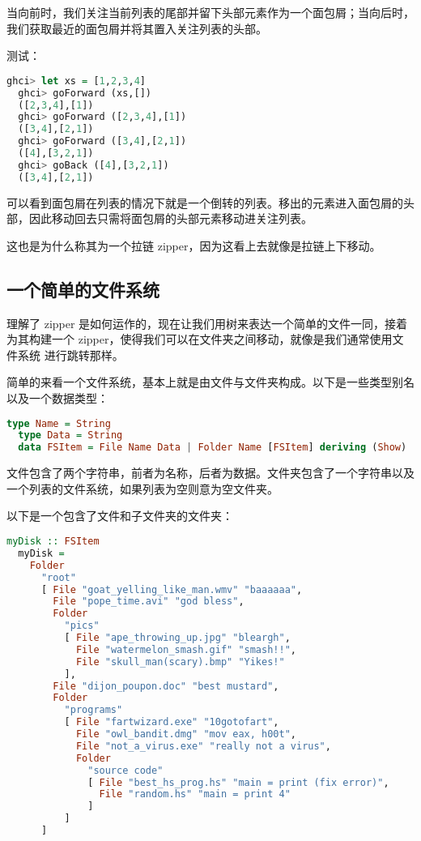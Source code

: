 \documentclass[./main.tex]{subfiles}
\begin{document}
当向前时，我们关注当前列表的尾部并留下头部元素作为一个面包屑；当向后时，我们获取最近的面包屑并将其置入关注列表的头部。

测试：

\begin{lstlisting}[language=Haskell]
  ghci> let xs = [1,2,3,4]
  ghci> goForward (xs,[])
  ([2,3,4],[1])
  ghci> goForward ([2,3,4],[1])
  ([3,4],[2,1])
  ghci> goForward ([3,4],[2,1])
  ([4],[3,2,1])
  ghci> goBack ([4],[3,2,1])
  ([3,4],[2,1])
\end{lstlisting}

可以看到面包屑在列表的情况下就是一个倒转的列表。移出的元素进入面包屑的头部，因此移动回去只需将面包屑的头部元素移动进关注列表。

这也是为什么称其为一个拉链 zipper，因为这看上去就像是拉链上下移动。

\subsection*{一个简单的文件系统}

理解了 zipper 是如何运作的，现在让我们用树来表达一个简单的文件一同，接着为其构建一个 zipper，使得我们可以在文件夹之间移动，就像是我们通常使用文件系统
进行跳转那样。

简单的来看一个文件系统，基本上就是由文件与文件夹构成。以下是一些类型别名以及一个数据类型：

\begin{lstlisting}[language=Haskell]
  type Name = String
  type Data = String
  data FSItem = File Name Data | Folder Name [FSItem] deriving (Show)
\end{lstlisting}

文件包含了两个字符串，前者为名称，后者为数据。文件夹包含了一个字符串以及一个列表的文件系统，如果列表为空则意为空文件夹。

以下是一个包含了文件和子文件夹的文件夹：

\begin{lstlisting}[language=Haskell]
  myDisk :: FSItem
  myDisk =
    Folder
      "root"
      [ File "goat_yelling_like_man.wmv" "baaaaaa",
        File "pope_time.avi" "god bless",
        Folder
          "pics"
          [ File "ape_throwing_up.jpg" "bleargh",
            File "watermelon_smash.gif" "smash!!",
            File "skull_man(scary).bmp" "Yikes!"
          ],
        File "dijon_poupon.doc" "best mustard",
        Folder
          "programs"
          [ File "fartwizard.exe" "10gotofart",
            File "owl_bandit.dmg" "mov eax, h00t",
            File "not_a_virus.exe" "really not a virus",
            Folder
              "source code"
              [ File "best_hs_prog.hs" "main = print (fix error)",
                File "random.hs" "main = print 4"
              ]
          ]
      ]
\end{lstlisting}
\end{document}
